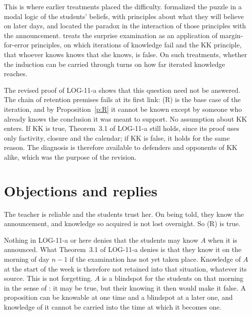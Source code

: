 \documentclass{situationist-preprint}
\begin{document}
This is where earlier treatments placed the difficulty. \citet{Binkley1968} formalized the puzzle in a modal logic of the students' beliefs, with principles about what they will believe on later days, and located the paradox in the interaction of those principles with the announcement. \citet[ch.~6]{Williamson2000} treats the surprise examination as an application of margin-for-error principles, on which iterations of knowledge fail and the KK principle, that whoever knows knows that she knows, is false. On such treatments, whether the induction can be carried through turns on how far iterated knowledge reaches.

The revised proof of LOG-11-a shows that this question need not be answered. The chain of retention premises fails at its first link: (R) is the base case of the iteration, and by Proposition~\ref{p:R} it cannot be known except by someone who already knows the conclusion it was meant to support. No assumption about KK enters. If KK is true, Theorem~3.1 of LOG-11-a still holds, since its proof uses only factivity, closure and the calendar; if KK is false, it holds for the same reason. The diagnosis is therefore available to defenders and opponents of KK alike, which was the purpose of the revision.

\section{Objections and replies}

\begin{objection}[Testimony]
The teacher is reliable and the students trust her. On being told, they know the announcement, and knowledge so acquired is not lost overnight. So (R) is true.
\end{objection}

\begin{reply}
Nothing in LOG-11-a or here denies that the students may know $A$ when it is announced. What Theorem~3.1 of LOG-11-a denies is that they know it on the morning of day $n-1$ if the examination has not yet taken place. Knowledge of $A$ at the start of the week is therefore not retained into that situation, whatever its source. This is not forgetting. $A$ is a blindspot for the students on that morning in the sense of \citet{Sorensen1988}: it may be true, but their knowing it then would make it false. A proposition can be knowable at one time and a blindspot at a later one, and knowledge of it cannot be carried into the time at which it becomes one.
\end{reply}
\end{document}

